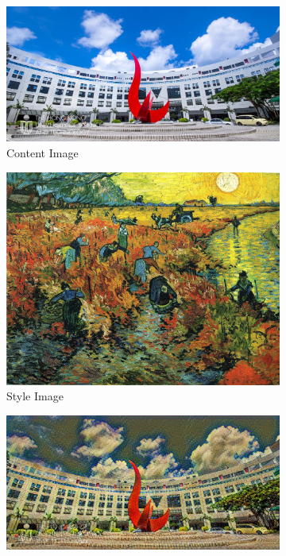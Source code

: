 \documentclass{article}
\begin{document}
\begin{figure}[ht]
    \begin{minipage}{\textwidth}
        \centering
        \begin{subfigure}{0.25\textwidth}
            \includegraphics[width=\textwidth]{./data_set/HKUST/3.jpg}
            \caption{Content Image}
        \end{subfigure}
        \hfill %
        \begin{subfigure}{0.25\textwidth}
            \includegraphics[width=\textwidth]{./wikiart/Post_Impressionism/vincent-van-gogh_red-vineyards-at-arles-1888.jpg}
            \caption{Style Image}
        \end{subfigure}
        \hfill %
        \begin{subfigure}{0.25\textwidth}
            \includegraphics[width=\textwidth]{./part1_inference/output_3_vincent-van-gogh_red-vineyards-at-arles-1888.jpg}

\end{subfigure}
\end{minipage}
\end{figure}
\end{document}
